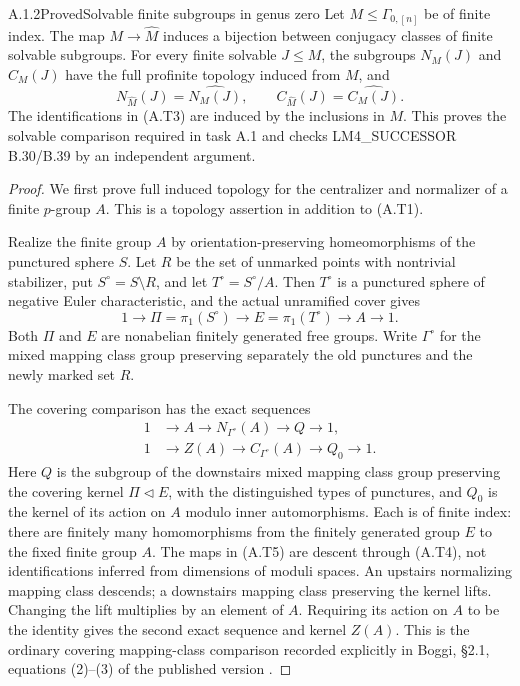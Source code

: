\begin{result}{A.1.2}{Proved}{Solvable finite subgroups in genus zero}
Let $M\leq\Gamma_{0,[n]}$ be of finite index.  The map
$M\to\widehat M$ induces a bijection between conjugacy classes of
finite solvable subgroups.  For every finite solvable $J\leq M$,
the subgroups $N_M(J)$ and $C_M(J)$ have the full profinite topology
induced from $M$, and
\[
 N_{\widehat M}(J)=\widehat{N_M(J)},\qquad
 C_{\widehat M}(J)=\widehat{C_M(J)}.                    \tag{A.T3}
\]
The identifications in (A.T3) are induced by the inclusions in $M$.
This proves the solvable comparison required in task A.1 and checks
LM4\_SUCCESSOR B.30/B.39 by an independent argument.
\end{result}
\begin{proof}
We first prove full induced topology for the centralizer and
normalizer of a finite $p$-group $A$.  This is a topology assertion
in addition to (A.T1).

Realize the finite group $A$ by orientation-preserving
homeomorphisms of the punctured sphere $S$.  Let $R$ be the set of
unmarked points with nontrivial stabilizer, put
$S^\circ=S\setminus R$, and let
$T^\circ=S^\circ/A$.  Then $T^\circ$ is a punctured sphere of
negative Euler characteristic, and the actual unramified cover gives
\[
 1\longrightarrow\Pi=\pi_1(S^\circ)
 \longrightarrow E=\pi_1(T^\circ)
 \longrightarrow A\longrightarrow1.                    \tag{A.T4}
\]
Both $\Pi$ and $E$ are nonabelian finitely generated free groups.
Write $\Gamma^\circ$ for the mixed mapping class group preserving
separately the old punctures and the newly marked set $R$.

The covering comparison has the exact sequences
\[
\begin{split}
 1&\longrightarrow A\longrightarrow N_{\Gamma^\circ}(A)
       \longrightarrow Q\longrightarrow1,\\
 1&\longrightarrow Z(A)\longrightarrow C_{\Gamma^\circ}(A)
       \longrightarrow Q_0\longrightarrow1.             
\end{split}\tag{A.T5}
\]
Here $Q$ is the subgroup of the downstairs mixed mapping class group
preserving the covering kernel $\Pi\triangleleft E$, with the
distinguished types of punctures, and $Q_0$ is the kernel of its
action on $A$ modulo inner automorphisms.  Each is of finite index:
there are finitely many homomorphisms from the finitely generated
group $E$ to the fixed finite group $A$.  The maps in (A.T5) are
descent through (A.T4), not identifications inferred from dimensions
of moduli spaces.  An upstairs normalizing mapping class descends;
a downstairs mapping class preserving the kernel lifts.  Changing
the lift multiplies by an element of $A$.  Requiring its action on
$A$ to be the identity gives the second exact sequence and kernel
$Z(A)$.  This is the ordinary covering mapping-class comparison
recorded explicitly in Boggi, \S2.1, equations (2)--(3)
of the published version \cite{CA_Boggi2026}.


\end{proof}
